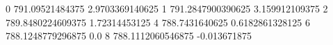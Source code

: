 0 791.09521484375 2.9703369140625
1 791.2847900390625 3.159912109375
2 789.8480224609375 1.72314453125
4 788.7431640625 0.6182861328125
6 788.1248779296875 0.0
8 788.1112060546875 -0.013671875
